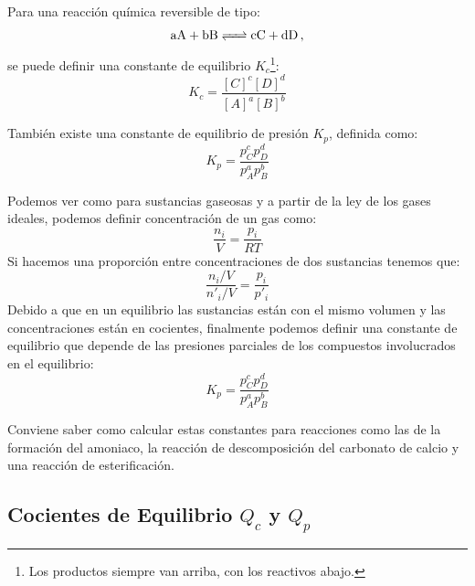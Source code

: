 \documentclass[arial,a4paper,print]{article}
\begin{document}
Para una reacción química reversible de tipo:
\begin{equation*}
	\ce{aA + bB <=> cC + dD}\,,
\end{equation*}
se puede definir una constante de equilibrio $K_{c}$\footnote{Los productos siempre van arriba, con los reactivos abajo.}:
\begin{equation*}
	K_{c} = \frac{[C]^{c}[D]^{d}}{[A]^{a}[B]^{b}}
\end{equation*}

También existe una constante de equilibrio de presión $K_{p}$, definida como:
\begin{equation*}
	K_{p} = \frac{p_{C}^{c}p_{D}^{d}}{p_{A}^{a}p_{B}^{b}}
\end{equation*}

Podemos ver como para sustancias gaseosas y a partir de la ley de los gases ideales, podemos definir concentración de un gas como:
\begin{equation*}
	\frac{n_{i}}{V} = \frac{p_{i}}{RT}
\end{equation*}
Si hacemos una proporción entre concentraciones de dos sustancias tenemos que:
\begin{equation*}
	\frac{n_{i}/V}{n'_{i}/V} = \frac{p_{i}}{p'_{i}}
\end{equation*}
Debido a que en un equilibrio las sustancias están con el mismo volumen y las concentraciones están en cocientes, finalmente podemos definir una constante de equilibrio que depende de las presiones parciales de los compuestos involucrados en el equilibrio:
\begin{equation*}
	K_{p} = \frac{p_{C}^{c}p_{D}^{d}}{p_{A}^{a}p_{B}^{b}}
\end{equation*}

Conviene saber como calcular estas constantes para reacciones como las de la formación del amoniaco, la reacción de descomposición del carbonato de calcio y una reacción de esterificación. 

\subsection{Cocientes de Equilibrio $Q_{c}$ y $Q_{p}$}
\end{document}
